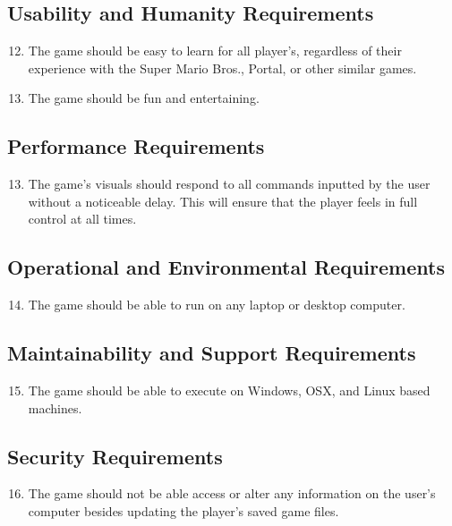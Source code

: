 \documentclass[12pt, titlepage]{article}
\begin{document}
\subsection{Usability and Humanity Requirements}
\begin{enumerate}
\setcounter{enumi}{11}
	\item The game should be easy to learn for all player's, regardless of their experience with the Super Mario Bros., Portal, or other similar games.
	\item The game should be fun and entertaining.
\end{enumerate}

\subsection{Performance Requirements}
\begin{enumerate}
\setcounter{enumi}{12}
	\item The game's visuals should respond to all commands inputted by the user without a noticeable delay. This will ensure that the player feels in full control at all times.
\end{enumerate}

\subsection{Operational and Environmental Requirements}
\begin{enumerate}
\setcounter{enumi}{13}
	\item The game should be able to run on any laptop or desktop computer.
\end{enumerate}

\subsection{Maintainability and Support Requirements}
\begin{enumerate}
\setcounter{enumi}{14}
	\item The game should be able to execute on Windows, OSX, and Linux based machines.
\end{enumerate}

\subsection{Security Requirements}
\begin{enumerate}
\setcounter{enumi}{15}
	\item The game should not be able access or alter any information on the user's computer besides updating the player's saved game files.
\end{enumerate}
\end{document}

